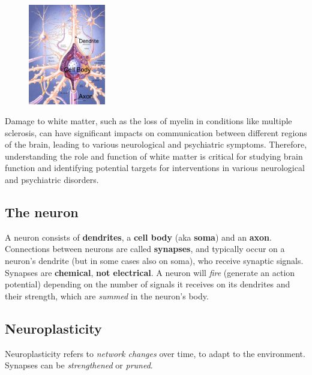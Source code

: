 \begin{figure}
  \centering
  \includegraphics[width=0.3\textwidth]{images/neuron.png}
\end{figure}
Damage to white matter, such as the loss of myelin in conditions like multiple sclerosis, can have significant impacts on communication between different regions of the brain, leading to various neurological and psychiatric symptoms. Therefore, understanding the role and function of white matter is critical for studying brain function and identifying potential targets for interventions in various neurological and psychiatric disorders.

\subsection{The neuron}
A neuron consists of \textbf{dendrites}, a \textbf{cell body} (aka \textbf{soma}) and an \textbf{axon}. Connections between neurons are called \textbf{synapses}, and typically occur on a neuron’s dendrite (but in some cases also on soma), who receive synaptic signals. Synapses are \textbf{chemical}, \textbf{not electrical}.
A neuron will \textit{fire} (generate an action potential) depending on the number of signals it receives on its dendrites and their strength, which are \textit{summed} in the neuron’s body. 


\subsection{Neuroplasticity}
Neuroplasticity refers to \textit{network changes} over time, to adapt to the environment.
Synapses can be \textit{strengthened} or \textit{pruned}.

